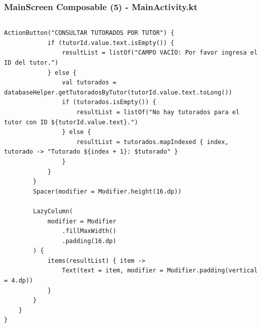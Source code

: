 \documentclass[pdf,
serif,
compress,
xcolor=table,
dvipsnames,
spanish,
aspectratio=169]{beamer}
\begin{document}

\begin{frame}[fragile]
    \frametitle{MainScreen Composable (5) - MainActivity.kt}
\begin{columns}
\begin{verbatim}
ActionButton("CONSULTAR TUTORADOS POR TUTOR") {
            if (tutorId.value.text.isEmpty()) {
                resultList = listOf("CAMPO VACÍO: Por favor ingresa el ID del tutor.")
            } else {
                val tutorados = databaseHelper.getTutoradosByTutor(tutorId.value.text.toLong())
                if (tutorados.isEmpty()) {
                    resultList = listOf("No hay tutorados para el tutor con ID ${tutorId.value.text}.")
                } else {
                    resultList = tutorados.mapIndexed { index, tutorado -> "Tutorado ${index + 1}: $tutorado" }
                }
            }
        }
        Spacer(modifier = Modifier.height(16.dp))
        
        LazyColumn(
            modifier = Modifier
                .fillMaxWidth()
                .padding(16.dp)
        ) {
            items(resultList) { item ->
                Text(text = item, modifier = Modifier.padding(vertical = 4.dp))
            }
        }
    }
}
\end{verbatim}
\end{columns}
\end{frame}

\end{document}
